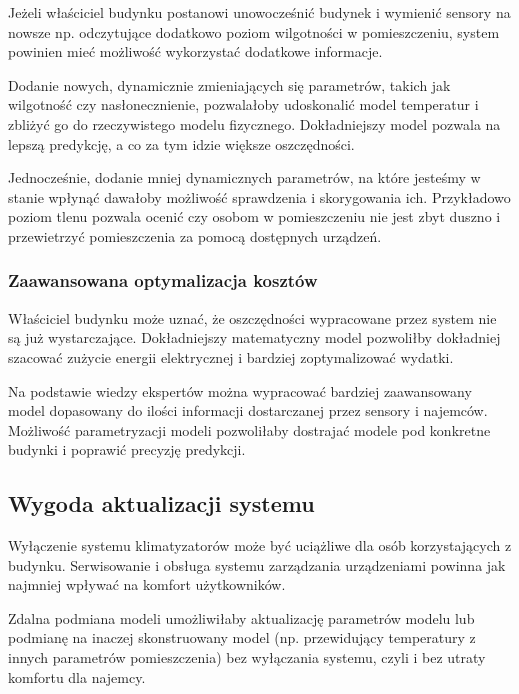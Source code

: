 Jeżeli właściciel budynku postanowi unowocześnić budynek i wymienić sensory na nowsze np. odczytujące dodatkowo poziom wilgotności w pomieszczeniu, system powinien mieć możliwość wykorzystać dodatkowe informacje.

Dodanie nowych, dynamicznie zmieniających się parametrów, takich jak wilgotność czy nasłonecznienie, pozwalałoby udoskonalić model temperatur i zbliżyć go do rzeczywistego modelu fizycznego. Dokładniejszy model pozwala na lepszą predykcję, a co za tym idzie większe oszczędności.

Jednocześnie, dodanie mniej dynamicznych parametrów, na które jesteśmy w stanie wpłynąć dawałoby możliwość sprawdzenia i skorygowania ich. Przykładowo poziom tlenu pozwala ocenić czy osobom w pomieszczeniu nie jest zbyt duszno i przewietrzyć pomieszczenia za pomocą dostępnych urządzeń. 


\subsubsection*{Zaawansowana optymalizacja kosztów}
Właściciel budynku może uznać, że oszczędności wypracowane przez system nie są już wystarczające. 
Dokładniejszy matematyczny model pozwoliłby dokładniej szacować zużycie energii elektrycznej i bardziej zoptymalizować wydatki. 

Na podstawie wiedzy ekspertów można wypracować bardziej zaawansowany model dopasowany do ilości informacji dostarczanej przez sensory i najemców.
Możliwość parametryzacji modeli pozwoliłaby dostrajać modele pod konkretne budynki i poprawić precyzję predykcji.

\subsection*{Wygoda aktualizacji systemu}
Wyłączenie systemu klimatyzatorów może być uciążliwe dla osób korzystających z budynku. 
Serwisowanie i obsługa systemu zarządzania urządzeniami powinna jak najmniej wpływać na komfort użytkowników.

Zdalna podmiana modeli umożliwiłaby aktualizację parametrów modelu lub podmianę na inaczej skonstruowany model (np. przewidujący temperatury z innych parametrów pomieszczenia) bez wyłączania systemu, czyli i bez utraty komfortu dla najemcy. 

